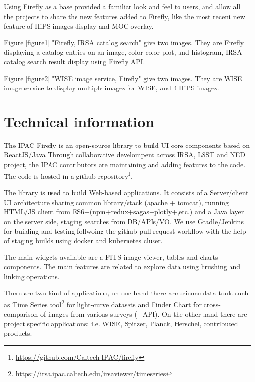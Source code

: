 \documentclass[11pt,twoside]{article}
\begin{document}
Using Firefly as a base provided a familiar look and feel to users, and allow all the projects to share the new features added to Firefly, like the most recent new feature of HiPS images display and MOC overlay.

Figure \ref{figure1} "Firefly, IRSA catalog search" give two images. They are Firefly displaying a catalog entries on an image, color-color plot, and histogram,
IRSA catalog search result display using Firefly API.

Figure \ref{figure2} "WISE image service, Firefly" give two images. They are WISE image service to display multiple images for WISE, and 4 HiPS images.


\smallskip
\smallskip

\section{Technical information}

The IPAC Firefly is an open-source library to build UI core components based on ReactJS/Java Through collaborative develompent across IRSA, LSST and NED project, the IPAC contributors are maintaining and adding features to the code.
The code is hosted in a github repository\footnote{\url{https://github.com/Caltech-IPAC/firefly}}.

The library is used to build Web-based applications. It consists of a Server/client UI architecture sharing common library/stack (apache + tomcat), running HTML/JS client from ES6+(npm+redux+sagas+plotly+,etc.) and a Java layer on the server side, staging searches from DB/APIs/VO. We use Gradle/Jenkins for building and testing follwoing the github pull request workflow with the help of staging builds using docker and kubernetes cluser.

The main widgets available are a FITS image viewer, tables and charts components. The main features are related to explore data using brushing and linking operations.

There are two kind of applications, on one hand there are science data tools such as Time Series tool\footnote{\url{https://irsa.ipac.caltech.edu/irsaviewer/timeseries}} for light-curve datasets and Finder Chart for cross-comparison of images from various surveys (+API).
On the other hand there are project specific applications: i.e. WISE, Spitzer, Planck, Herschel, contributed products.
\end{document}
